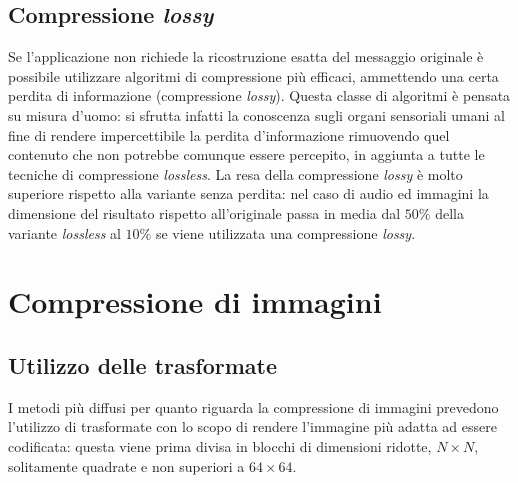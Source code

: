 \subsection{Compressione \emph{lossy}}

Se l'applicazione non richiede la ricostruzione esatta del messaggio originale 
è possibile utilizzare algoritmi di compressione più efficaci, %
ammettendo una certa perdita di informazione (compressione \emph{lossy}).
Questa classe di algoritmi è pensata su misura d'uomo:
si sfrutta infatti la conoscenza sugli organi sensoriali umani al 
fine di rendere impercettibile la perdita d'informazione rimuovendo quel  
contenuto che non potrebbe comunque essere percepito, in
aggiunta a tutte le tecniche di compressione \emph{lossless}.
La resa della compressione \emph{lossy} è molto superiore rispetto 
alla variante senza perdita: nel caso di audio ed immagini la dimensione del 
risultato rispetto all'originale passa in media dal $50\%$ della 
variante \emph{lossless} al $10\%$ se viene utilizzata una compressione 
\emph{lossy}.


\section{Compressione di immagini}



\subsection{Utilizzo delle trasformate}

I metodi più diffusi per quanto riguarda la compressione di immagini prevedono 
l'utilizzo di trasformate con lo scopo di rendere l'immagine più adatta ad 
essere codificata: questa viene prima divisa in blocchi di dimensioni ridotte, 
$N\times N$, solitamente quadrate e non superiori a $64\times64$.\\

